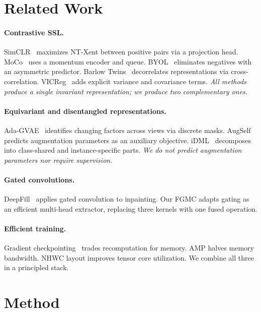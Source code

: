 \documentclass[10pt,twocolumn]{article}
\begin{document}
\section{Related Work}
\label{sec:related}

\paragraph{Contrastive SSL.}
SimCLR~\cite{simclr} maximizes NT-Xent between positive pairs via a projection
head. MoCo~\cite{moco} uses a momentum encoder and queue. BYOL~\cite{byol}
eliminates negatives with an asymmetric predictor. Barlow Twins~\cite{barlow}
decorrelates representations via cross-correlation. VICReg~\cite{vicreg} adds
explicit variance and covariance terms. \emph{All methods produce a single
invariant representation; we produce two complementary ones.}

\paragraph{Equivariant and disentangled representations.}
Ada-GVAE~\cite{adagvae} identifies changing factors across views via discrete
masks. AugSelf~\cite{augself} predicts augmentation parameters as an auxiliary
objective. iDML~\cite{idml} decomposes into class-shared and instance-specific
parts. \emph{We do not predict augmentation parameters nor require supervision.}

\paragraph{Gated convolutions.}
DeepFill~\cite{deepfill} applies gated convolution to inpainting. Our FGMC
adapts gating as an efficient multi-head extractor, replacing three kernels with one
fused operation.

\paragraph{Efficient training.}
Gradient checkpointing~\cite{gradckpt} trades recomputation for memory. AMP
\cite{amp} halves memory bandwidth. NHWC layout improves tensor core
utilization. We combine all three in a principled stack.

\section{Method}
\label{sec:method}
\end{document}

